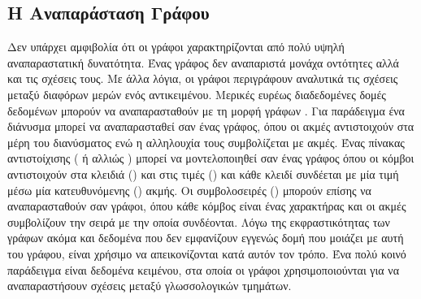 \subsection{H Αναπαράσταση Γράφου}
Δεν υπάρχει αμφιβολία ότι οι γράφοι χαρακτηρίζονται από πολύ υψηλή αναπαραστατική δυνατότητα.
Ένας γράφος δεν αναπαριστά μονάχα οντότητες αλλά και τις σχέσεις τους.
Με άλλα λόγια, οι γράφοι περιγράφουν αναλυτικά τις σχέσεις μεταξύ διαφόρων μερών ενός αντικειμένου. 
Μερικές ευρέως διαδεδομένες δομές δεδομένων μπορούν να αναπαρασταθούν με τη μορφή γράφων \cite{borgwardt2007}. 
Για παράδειγμα ένα διάνυσμα μπορεί να αναπαρασταθεί σαν ένας γράφος, όπου οι ακμές αντιστοιχούν στα μέρη του διανύσματος ενώ η αλληλουχία τους συμβολίζεται με ακμές.
Ένας πίνακας αντιστοίχισης ( ή αλλιώς ) μπορεί να μοντελοποιηθεί σαν ένας γράφος όπου οι κόμβοι αντιστοιχούν στα κλειδιά () και στις τιμές () και κάθε κλειδί συνδέεται με μία τιμή μέσω μία κατευθυνόμενης () ακμής. 
Οι συμβολοσειρές () μπορούν επίσης να αναπαρασταθούν σαν γράφοι, όπου κάθε κόμβος είναι ένας χαρακτήρας και οι ακμές συμβολίζουν την σειρά με την οποία συνδέονται. 
Λόγω της εκφραστικότητας των γράφων ακόμα και δεδομένα που δεν εμφανίζουν εγγενώς δομή που μοιάζει με αυτή του γράφου, είναι χρήσιμο να απεικονίζονται κατά αυτόν τον τρόπο.
Ένα πολύ κοινό παράδειγμα είναι δεδομένα κειμένου, στα οποία οι γράφοι χρησιμοποιούνται για να αναπαραστήσουν σχέσεις μεταξύ γλωσσολογικών τμημάτων.

